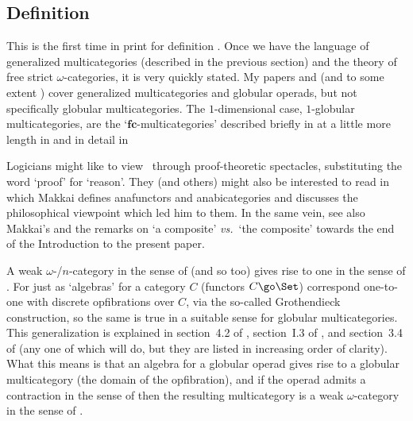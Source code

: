 \subsection*{Definition \lp}

This is the first time in print for definition \lp.  Once we have the
language of generalized multicategories (described in the previous section)
and the theory of free strict $\omega$-categories, it is very quickly stated.
My papers  and  (and to some extent ) cover
generalized multicategories and globular operads, but not specifically
globular multicategories.  The $1$-dimensional case, $1$-globular
multicategories, are the `$\mathbf{fc}$-multicategories' described briefly in
% 
%
% 
at a little more length in
% 
%
% 
and in detail in
% 
%
% 

Logicians might like to view \lp\ through proof-theoretic spectacles,
substituting the word `proof' for `reason'.  They (and others) might also be
interested to read
% 
%
% 
in which Makkai defines anafunctors and anabicategories and discusses the
philosophical viewpoint which led him to them.  In the same vein, see also
Makkai's  and the remarks on `a composite' \emph{vs.}\ `the
composite' towards the end of the Introduction to the present paper. 

A weak $\omega$-/$n$-category in the sense of  (and so  too)
gives rise to one in the sense of \lp.  For just as `algebras' for a category
$C$ (functors $C \go \Set$) correspond one-to-one with discrete opfibrations
over $C$, via the so-called Gro\-th\-en\-dieck construction, so the same is
true in a suitable sense for globular multicategories.  This generalization
is explained in section~4.2 of , section~I.3 of , and
section~3.4 of  (any one of which will do, but they are listed in
increasing order of clarity).  What this means is that an algebra for a
globular operad gives rise to a globular multicategory (the domain of the
opfibration), and if the operad admits a contraction in the sense of 
then the resulting multicategory is a weak $\omega$-category in the sense of
\lp.

